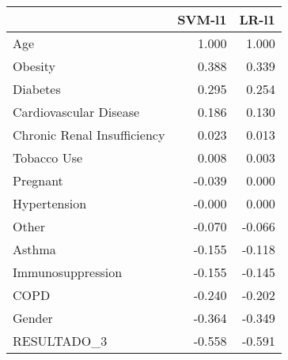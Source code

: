 \begin{tabular}{lrr}
\toprule
{} &  SVM-l1 &  LR-l1 \\
\midrule
Age                         &   1.000 &  1.000 \\
Obesity                     &   0.388 &  0.339 \\
Diabetes                    &   0.295 &  0.254 \\
Cardiovascular Disease      &   0.186 &  0.130 \\
Chronic Renal Insufficiency &   0.023 &  0.013 \\
Tobacco Use                 &   0.008 &  0.003 \\
Pregnant                    &  -0.039 &  0.000 \\
Hypertension                &  -0.000 &  0.000 \\
Other                       &  -0.070 & -0.066 \\
Asthma                      &  -0.155 & -0.118 \\
Immunosuppression           &  -0.155 & -0.145 \\
COPD                        &  -0.240 & -0.202 \\
Gender                      &  -0.364 & -0.349 \\
RESULTADO\_3                 &  -0.558 & -0.591 \\
\bottomrule
\end{tabular}

